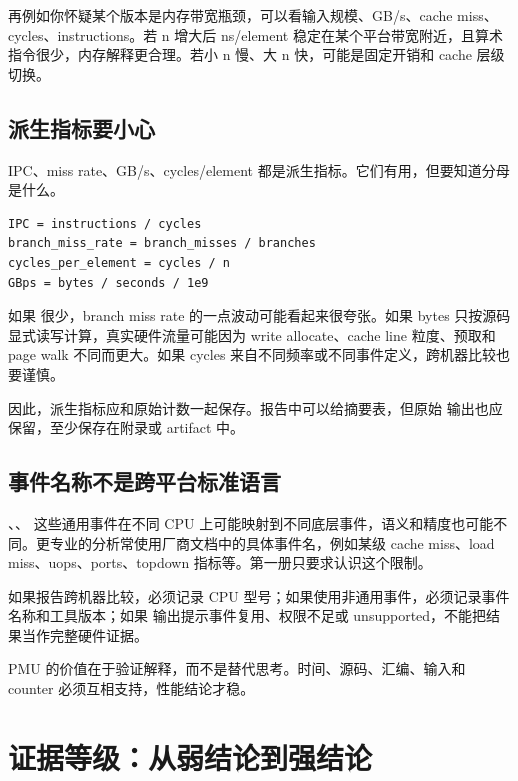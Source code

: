 再例如你怀疑某个版本是内存带宽瓶颈，可以看输入规模、GB/s、cache miss、cycles、instructions。若 n 增大后 ns/element 稳定在某个平台带宽附近，且算术指令很少，内存解释更合理。若小 n 慢、大 n 快，可能是固定开销和 cache 层级切换。

\subsection{派生指标要小心}

IPC、miss rate、GB/s、cycles/element 都是派生指标。它们有用，但要知道分母是什么。

\begin{lstlisting}
IPC = instructions / cycles
branch_miss_rate = branch_misses / branches
cycles_per_element = cycles / n
GBps = bytes / seconds / 1e9
\end{lstlisting}

如果  很少，branch miss rate 的一点波动可能看起来很夸张。如果 bytes 只按源码显式读写计算，真实硬件流量可能因为 write allocate、cache line 粒度、预取和 page walk 不同而更大。如果 cycles 来自不同频率或不同事件定义，跨机器比较也要谨慎。

因此，派生指标应和原始计数一起保存。报告中可以给摘要表，但原始  输出也应保留，至少保存在附录或 artifact 中。

\subsection{事件名称不是跨平台标准语言}

、、 这些通用事件在不同 CPU 上可能映射到不同底层事件，语义和精度也可能不同。更专业的分析常使用厂商文档中的具体事件名，例如某级 cache miss、load miss、uops、ports、topdown 指标等。第一册只要求认识这个限制。

如果报告跨机器比较，必须记录 CPU 型号；如果使用非通用事件，必须记录事件名称和工具版本；如果  输出提示事件复用、权限不足或 unsupported，不能把结果当作完整硬件证据。

\begin{keyidea}
PMU 的价值在于验证解释，而不是替代思考。时间、源码、汇编、输入和 counter 必须互相支持，性能结论才稳。
\end{keyidea}

\section{证据等级：从弱结论到强结论}

